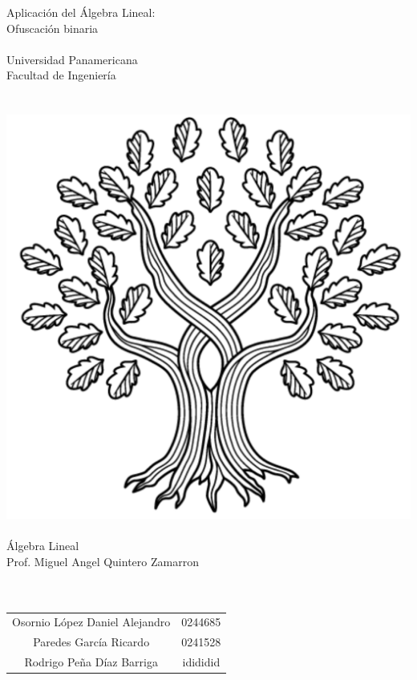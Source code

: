 \documentclass[a4paper]{article}
\begin{document}
\hspace{0pt}
\vfill

\begin{center}
    {\huge Aplicación del Álgebra Lineal:\\Ofuscación binaria}\\    \quad\\
    {\large Universidad Panamericana}\\
    {\large Facultad de Ingeniería}\\
    \quad\\
    \quad\\
    \includegraphics[scale=0.3]{UP}
    \quad\\
    \quad\\
    Álgebra Lineal\\
    Prof. Miguel Angel Quintero Zamarron\\
    \quad\\
    \quad\\
    \begin{tabular}{c|c}
        Osornio López Daniel Alejandro & 0244685\\
        Paredes García Ricardo & 0241528\\
        Rodrigo Peña Díaz Barriga & idididid\\
    \end{tabular}\\
    \quad\\
    \quad\\
\end{center}
\end{document}

